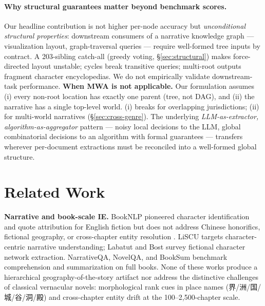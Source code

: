 \documentclass[11pt]{article}
\newenvironment{CJK}[2]{}{}
\begin{document}
\paragraph{Why structural guarantees matter beyond benchmark scores.} Our headline contribution is not higher per-node accuracy but \textit{unconditional structural properties}: downstream consumers of a narrative knowledge graph --- visualization layout, graph-traversal queries --- require well-formed tree inputs by contract. A 203-sibling catch-all (greedy voting, §\ref{sec:structural}) makes force-directed layout unstable; cycles break transitive queries; multi-root outputs fragment character encyclopedias. We do not empirically validate downstream-task performance.
\textbf{When MWA is not applicable.} Our formulation assumes (i) every non-root location has exactly one parent (tree, not DAG), and (ii) the narrative has a single top-level world. (i) breaks for overlapping jurisdictions; (ii) for multi-world narratives (\S\ref{sec:cross-genre}). The underlying \emph{LLM-as-extractor, algorithm-as-aggregator} pattern --- noisy local decisions to the LLM, global combinatorial decisions to an algorithm with formal guarantees --- transfers wherever per-document extractions must be reconciled into a well-formed global structure.

\section{Related Work}
\label{sec:related}

\textbf{Narrative and book-scale IE.} BookNLP \cite{bamman2014bayesian} pioneered character identification and quote attribution for English fiction but does not address Chinese honorifics, fictional geography, or cross-chapter entity resolution \cite{bagga1998entity,cattan2021crossdoc}. LiSCU \cite{brahman2021plot} targets character-centric narrative understanding; Labatut and Bost \cite{labatut2019fictional} survey fictional character network extraction. NarrativeQA, NovelQA, and BookSum \cite{kocisky2018narrativeqa,wang2025novelqa,kryscinski2022booksum} benchmark comprehension and summarization on full books. None of these works produce a hierarchical geography-of-the-story artifact nor address the distinctive challenges of classical vernacular novels: morphological rank cues in place names (\begin{CJK}{UTF8}{gbsn}界/洲/国/城/谷/洞/殿\end{CJK}) and cross-chapter entity drift at the 100--2{,}500-chapter scale.
\end{document}
